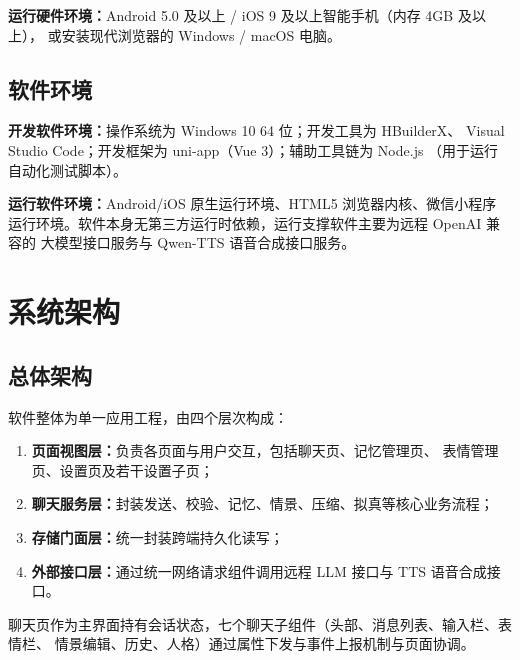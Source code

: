 \documentclass[zihao=5,a4paper]{ctexart}
\begin{document}
\textbf{运行硬件环境：}Android 5.0 及以上 / iOS 9 及以上智能手机（内存 4GB 及以上），
或安装现代浏览器的 Windows / macOS 电脑。

\subsection{软件环境}
\textbf{开发软件环境：}操作系统为 Windows 10 64 位；开发工具为 HBuilderX、
Visual Studio Code；开发框架为 uni-app（Vue 3）；辅助工具链为 Node.js
（用于运行自动化测试脚本）。

\textbf{运行软件环境：}Android/iOS 原生运行环境、HTML5 浏览器内核、微信小程序
运行环境。软件本身无第三方运行时依赖，运行支撑软件主要为远程 OpenAI 兼容的
大模型接口服务与 Qwen-TTS 语音合成接口服务。

\section{系统架构}

\subsection{总体架构}
软件整体为单一应用工程，由四个层次构成：
\begin{enumerate}[itemsep=0pt,parsep=0pt]
  \item \textbf{页面视图层：}负责各页面与用户交互，包括聊天页、记忆管理页、
        表情管理页、设置页及若干设置子页；
  \item \textbf{聊天服务层：}封装发送、校验、记忆、情景、压缩、拟真等核心业务流程；
  \item \textbf{存储门面层：}统一封装跨端持久化读写；
  \item \textbf{外部接口层：}通过统一网络请求组件调用远程 LLM 接口与 TTS 语音合成接口。
\end{enumerate}

聊天页作为主界面持有会话状态，七个聊天子组件（头部、消息列表、输入栏、表情栏、
情景编辑、历史、人格）通过属性下发与事件上报机制与页面协调。
\end{document}

